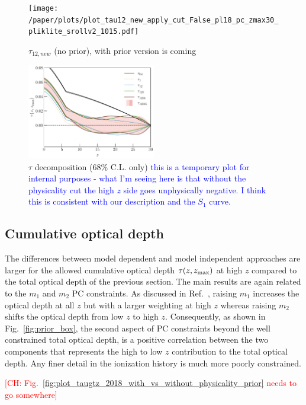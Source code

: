 \documentclass[prd,twocolumn,amsmath,amssymb,floatfix,superscriptaddress,nofootinbib]{revtex4-1}
\newcommand{\zmax}{z_{\rm max}}
\newcommand{\wh}[1]{\textcolor{blue}{#1}}
\newcommand{\ch}[1]{\textcolor{red}{#1}}
\begin{document}
{\begin{figure}[ht]
\texttt{[image: /paper/plots/plot\_tau12\_new\_apply\_cut\_False\_pl18\_pc\_zmax30\_pliklite\_srollv2\_1015.pdf]}
\caption{$\tau_{12,new}$ (no prior), with prior version is coming}
\label{fig:tau12}
\end{figure}

\begin{figure}[ht]
\includegraphics[width=0.5\textwidth]{results/tau_pc_decomposition/pl18_taugtz_pc_decomposition_68_only.pdf}
\caption{$\tau$ decomposition (68\% C.L. only) \wh{this is a temporary plot for internal purposes - what I'm seeing here is that without the physicality cut the high $z$ side goes unphysically negative.  I think this is consistent with our description and the $S_1$ curve.}}
\label{fig:tau12}
\end{figure}

\subsection{Cumulative optical depth}

The differences between model dependent and model independent approaches are larger for the allowed cumulative optical depth $\tau(z, \zmax)$ at high $z$
compared to the total optical depth of the previous section.
The main results are again related to the $m_1$ and $m_2$ PC constraints. 
As discussed in Ref.~\cite{Heinrich:2016ojb}, raising $m_1$ increases the  optical depth at all $z$ but with a larger weighting at high $z$ whereas
raising $m_2$ shifts the optical depth from low $z$ to high $z$.  
Consequently, as shown in Fig.~\ref{fig:prior_box}, the second aspect of PC constraints beyond the well constrained total optical depth, is a positive
correlation between the two components that represents the high to low $z$ 
contribution to the total optical depth.  Any finer detail in the ionization history is much more poorly constrained.

\ch{[CH: Fig.~\ref{fig:plot_taugtz_2018_with_vs_without_physicality_prior} needs to go somewhere]}

}
\end{document}
